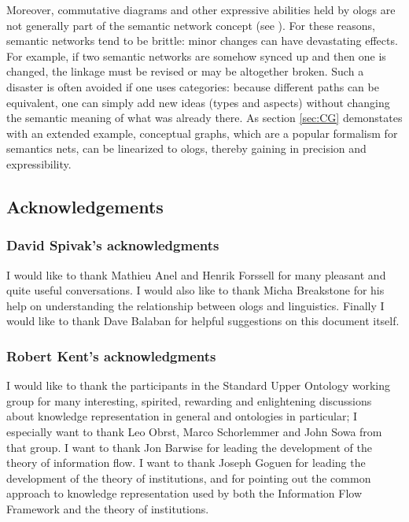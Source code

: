 \documentclass{amsart}
\theoremstyle{remark}
\theoremstyle{definition}
\begin{document}
Moreover, commutative diagrams and other expressive abilities held by ologs are not generally part of the semantic network concept (see \cite{Sow}). For these reasons, semantic networks tend to be brittle: minor changes can have devastating effects. For example, if two semantic networks are somehow synced up and then one is changed, the linkage must be revised or may be altogether broken. Such a disaster is often avoided if one uses categories: because different paths can be equivalent, one can simply add new ideas (types and aspects) without changing the semantic meaning of what was already there.
As section \ref{sec:CG} demonstates with an extended example,
conceptual graphs, which are a popular formalism for semantics nets,
can be linearized to ologs, thereby gaining in precision and expressibility.

\subsection{Acknowledgements}\label{sec:acknowledgements}

\subsubsection{David Spivak's acknowledgments}

I would like to thank Mathieu Anel and Henrik Forssell for many pleasant and quite useful conversations. I would also like to thank Micha Breakstone for his help on understanding the relationship between ologs and linguistics. Finally I would like to thank Dave Balaban for helpful suggestions on this document itself.

\subsubsection{Robert Kent's acknowledgments}

I would like to thank the participants in the Standard Upper Ontology working group
for many interesting, spirited, rewarding and enlightening discussions
about knowledge representation in general and ontologies in particular;
I especially want to thank Leo Obrst, Marco Schorlemmer and John Sowa from that group.
I want to thank Jon Barwise 
for leading the development of the theory of information flow.
I want to thank Joseph Goguen 
for leading the development of the theory of institutions,
and for pointing out the common approach to knowledge representation
used by both the Information Flow Framework and the theory of institutions.
\end{document}
